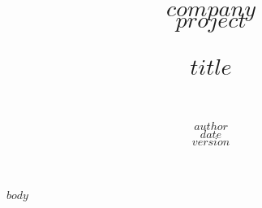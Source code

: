 \documentclass[paper=a4, fontsize=11pt]{scrartcl}
\title{
		\usefont{OT1}{bch}{b}{n}
		\normalfont \normalsize \textsc{$company$ \\
        $project$} \\ [25pt]
		\horrule{0.5pt} \\[0.4cm]
		\huge $title$ \\
		\horrule{2pt} \\[0.5cm]
}
\author{
		\normalfont 								\normalsize
        $author$\\[-3pt]		\normalsize
        $date$\\[-3pt]		\normalsize
        $version$
}
\date{}
\numberwithin{equation}{section}		%
\numberwithin{figure}{section}			%
\numberwithin{table}{section}				%
\begin{document}
\maketitle

\newpage

$body$

\end{document}
